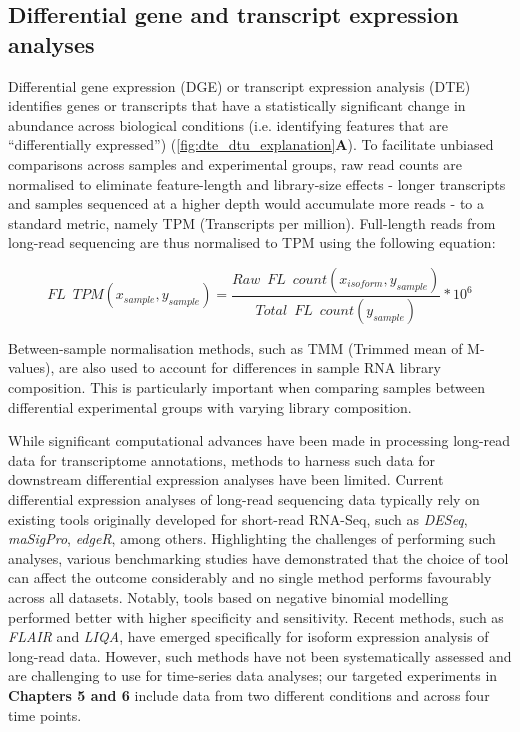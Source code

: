 \subsection{Differential gene and transcript expression analyses}
Differential gene expression (DGE) or transcript expression analysis (DTE) identifies genes or transcripts that have a statistically significant change in abundance across biological conditions (i.e. identifying features that are “differentially expressed”) (\cref{fig:dte_dtu_explanation}\textbf{A}). To facilitate unbiased comparisons across samples and experimental groups, raw read counts are normalised to eliminate feature-length and library-size effects - longer transcripts and samples sequenced at a higher depth would accumulate more reads - to a standard metric, namely TPM (Transcripts per million). Full-length reads from long-read sequencing are thus normalised to TPM using the following equation: 

\begin{myequation}[!h]
	\begin{equation}
		FL\;\:TPM (x_{sample},y_{sample})=\frac{Raw\;\:FL\;\:count (x_{isoform},y_{sample})}{Total\;\:FL\;\:count (y_{sample})} *10^6
	\end{equation}
\end{myequation}

Between-sample normalisation methods, such as TMM\cite{Robinson2010} (Trimmed mean of M-values), are also used to account for differences in sample RNA library composition. This is particularly important when comparing samples between differential experimental groups with varying library composition. 

While significant computational advances have been made in processing long-read data for transcriptome annotations, methods to harness such data for downstream differential expression analyses have been limited. Current differential expression analyses of long-read sequencing data typically rely on existing tools originally developed for short-read RNA-Seq\cite{Amarasinghe2020}, such as \textit{DESeq}, \textit{maSigPro}, \textit{edgeR}, among others. Highlighting the challenges of performing such analyses, various benchmarking studies have demonstrated that the choice of tool can affect the outcome considerably and no single method performs favourably across all datasets. Notably, tools based on negative binomial modelling performed better with higher specificity and sensitivity\cite{Rapaport2013}. Recent methods, such as \textit{FLAIR} and \textit{LIQA}\cite{Hu2021}, have emerged specifically for isoform expression analysis of long-read data. However, such methods have not been systematically assessed and are challenging to use for time-series data analyses; our targeted experiments in \textbf{Chapters 5 and 6} include data from two different conditions and across four time points. 

